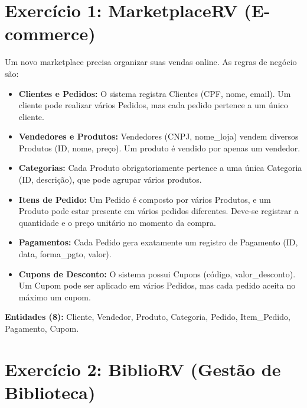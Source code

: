 \documentclass[12pt,a4paper]{article}
\newcommand{\resposta}[1]{
\noindent
\framebox[\textwidth]{
\begin{minipage}{0.98\textwidth}
\vspace{#1}
\end{minipage}
}
}
\begin{document}
\section*{Exercício 1: MarketplaceRV (E-commerce)}

Um novo marketplace precisa organizar suas vendas online. As regras de negócio são:
\begin{itemize}
    \item \textbf{Clientes e Pedidos:} O sistema registra Clientes (CPF, nome, email). Um cliente pode realizar vários Pedidos, mas cada pedido pertence a um único cliente.
    \item \textbf{Vendedores e Produtos:} Vendedores (CNPJ, nome\_loja) vendem diversos Produtos (ID, nome, preço). Um produto é vendido por apenas um vendedor.
    \item \textbf{Categorias:} Cada Produto obrigatoriamente pertence a uma única Categoria (ID, descrição), que pode agrupar vários produtos.
    \item \textbf{Itens de Pedido:} Um Pedido é composto por vários Produtos, e um Produto pode estar presente em vários pedidos diferentes. Deve-se registrar a quantidade e o preço unitário no momento da compra.
    \item \textbf{Pagamentos:} Cada Pedido gera exatamente um registro de Pagamento (ID, data, forma\_pgto, valor).
    \item \textbf{Cupons de Desconto:} O sistema possui Cupons (código, valor\_desconto). Um Cupom pode ser aplicado em vários Pedidos, mas cada pedido aceita no máximo um cupom.
\end{itemize}

\textbf{Entidades (8):} Cliente, Vendedor, Produto, Categoria, Pedido, Item\_Pedido, Pagamento, Cupom.

\resposta{10cm}

\newpage

\section*{Exercício 2: BiblioRV (Gestão de Biblioteca)}
\end{document}
